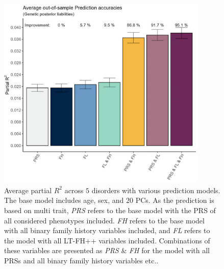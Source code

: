 \begin{figure}
	\includegraphics[width=10cm]{results/avg_partial_prediciton_accuracies_multi_trait.png}
	\caption[Average out of sample prediction for multi trait]{Average partial $ R^2 $ across $ 5 $ disorders with various prediction models. The base model includes age, sex, and $ 20 $ PCs. As the prediction is based on multi trait, \textit{PRS} refers to the base model with the PRS of all considered phenotypes included. \textit{FH} refers to the base model with all binary family history variables included, and \textit{FL} refers to the model with all LT-FH++ variables included. Combinations of these variables are presented as \textit{PRS} \& \textit{FH} for the model with all PRSs and all binary family history variables etc..}
	\label{fig:paper3:predictionResultsMultiTrait}
\end{figure}


